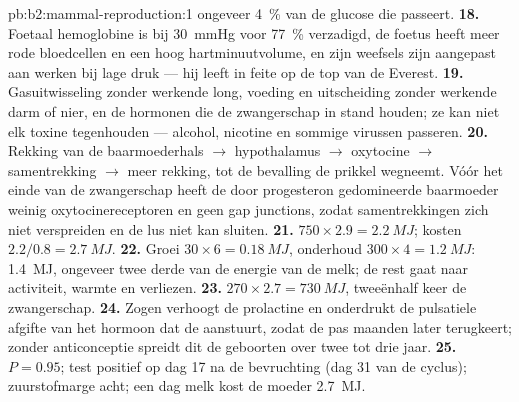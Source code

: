 \begin{solution}{pb:b2:mammal-reproduction:1}
ongeveer \qty{4}{\%} van de glucose die passeert.
\textbf{18.} Foetaal hemoglobine is bij \qty{30}{mmHg} voor \qty{77}{\%}
verzadigd, de foetus heeft meer rode bloedcellen en een hoog hartminuutvolume,
en zijn weefsels zijn aangepast aan werken bij lage druk --- hij leeft in
feite op de top van de Everest.
\textbf{19.} Gasuitwisseling zonder werkende long, voeding en uitscheiding
zonder werkende darm of nier, en de hormonen die de zwangerschap in stand
houden; ze kan niet elk toxine tegenhouden --- alcohol, nicotine en
sommige virussen passeren.
\textbf{20.} Rekking van de baarmoederhals $\to$ hypothalamus $\to$ oxytocine $\to$
samentrekking $\to$ meer rekking, tot de bevalling de prikkel wegneemt.
Vóór het einde van de zwangerschap heeft de door progesteron gedomineerde
baarmoeder weinig oxytocinereceptoren en geen gap junctions, zodat
samentrekkingen zich niet verspreiden en de lus niet kan sluiten.
\textbf{21.} $750\times 2.9 = \qty{2.2}{MJ}$; kosten $2.2/0.8 =
\qty{2.7}{MJ}$.
\textbf{22.} Groei $30\times 6 = \qty{0.18}{MJ}$, onderhoud
$300\times 4 = \qty{1.2}{MJ}$: \qty{1.4}{MJ}, ongeveer twee derde van de
energie van de melk; de rest gaat naar activiteit, warmte en verliezen.
\textbf{23.} $270\times 2.7 = \qty{730}{MJ}$, tweeënhalf keer de
zwangerschap.
\textbf{24.} Zogen verhoogt de prolactine en onderdrukt de pulsatiele
afgifte van het hormoon dat de  aanstuurt, zodat de  pas
maanden later terugkeert; zonder anticonceptie spreidt dit de geboorten
over twee tot drie jaar.
\textbf{25.} $P = 0.95$; test positief op dag 17 na de bevruchting
(dag 31 van de cyclus); zuurstofmarge acht; een dag melk kost de moeder
\qty{2.7}{MJ}.
\end{solution}

